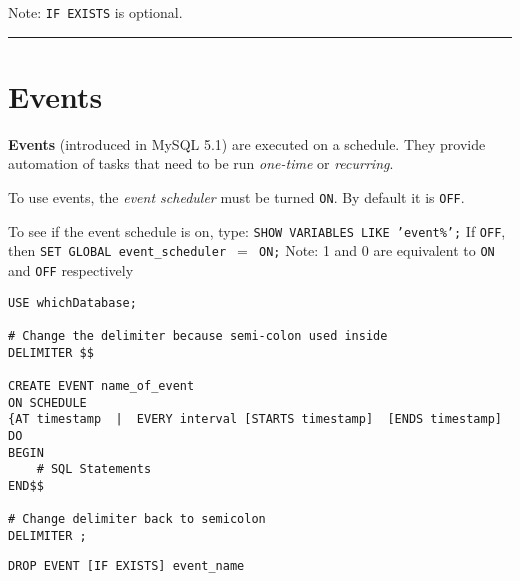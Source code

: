 \documentclass{article}
\begin{document}
\noindent Note: \texttt{IF EXISTS} is optional.

\hspace{-0.5cm}\rule[-0.101in]{\textwidth}{0.0025in}




 
















\section{Events}
 
 \textbf{Events} (introduced in MySQL 5.1) are executed on a schedule. They provide automation of tasks that need to be run  \textit{one-time} or \textit{recurring}.    

\begin{outline}
	\1 To use events, the \textit{event scheduler} must be turned \texttt{ON}.  By default it is \texttt{OFF}.
		
		\2 To see if the event schedule is on, type: \texttt{SHOW VARIABLES LIKE 'event\%';}
		\2 If \texttt{OFF}, then \texttt{SET GLOBAL event\_scheduler $=$ ON;}
		\2 Note: 1 and 0 are equivalent to \texttt{ON} and \texttt{OFF} respectively
		
	
\end{outline}

 
\begin{lstlisting}[frame=single]  
USE whichDatabase;

# Change the delimiter because semi-colon used inside
DELIMITER $$

CREATE EVENT name_of_event
ON SCHEDULE 
{AT timestamp  |  EVERY interval [STARTS timestamp]  [ENDS timestamp]
DO 
BEGIN
	# SQL Statements
END$$

# Change delimiter back to semicolon
DELIMITER ;
\end{lstlisting} 






\begin{lstlisting}[frame=single]  
DROP EVENT [IF EXISTS] event_name
\end{lstlisting} 
\end{document}
